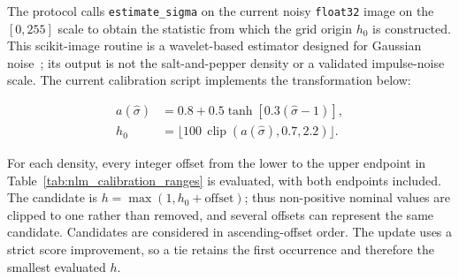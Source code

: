 \documentclass[pdflatex,iicol,sn-mathphys-num]{sn-jnl}
\newif\ifshowportuguese
\newcommand{\pt}[1]{\ifshowportuguese\par\begingroup\small\color{blue!55!black}\noindent\textbf{PT: }#1\par\endgroup\fi}
\begin{document}
The protocol calls \texttt{estimate\_sigma} on the current noisy \texttt{float32} image on the $[0,255]$ scale to obtain the statistic from which the grid origin $h_0$ is constructed. This scikit-image routine is a wavelet-based estimator designed for Gaussian noise~\cite{vanderwalt2014scikit,donoho1994ideal}; its output is not the salt-and-pepper density or a validated impulse-noise scale. The current calibration script implements the transformation below:
\pt{O protocolo chama \texttt{estimate\_sigma} na imagem ruidosa atual \texttt{float32}, na escala $[0,255]$, para obter a estatística a partir da qual se constrói a origem da grade $h_0$. Essa rotina do scikit-image é um estimador baseado em wavelets destinado a ruído Gaussiano~\cite{vanderwalt2014scikit,donoho1994ideal}; sua saída não é a densidade sal-e-pimenta nem uma escala validada para ruído impulsivo. O script atual de calibração implementa a transformação abaixo:}
\begin{equation}
\begin{aligned}
a(\hat{\sigma})&=0.8+0.5\tanh[0.3(\hat{\sigma}-1)],\\
h_0&=\lfloor100\,\operatorname{clip}(a(\hat{\sigma}),0.7,2.2)\rfloor.
\end{aligned}
\label{eq:nlm_grid_origin}
\end{equation}

For each density, every integer offset from the lower to the upper endpoint in Table~\ref{tab:nlm_calibration_ranges} is evaluated, with both endpoints included. The candidate is $h=\max(1,h_0+\mathrm{offset})$; thus non-positive nominal values are clipped to one rather than removed, and several offsets can represent the same candidate. Candidates are considered in ascending-offset order. The update uses a strict score improvement, so a tie retains the first occurrence and therefore the smallest evaluated $h$.
\pt{Para cada densidade, todo deslocamento inteiro entre os extremos inferior e superior da Tabela~\ref{tab:nlm_calibration_ranges} é avaliado, com ambas as pontas incluídas. O candidato é $h=\max(1,h_0+\mathrm{offset})$; assim, valores nominais não positivos são limitados a um, em vez de removidos, e diversos deslocamentos podem representar o mesmo candidato. Os candidatos são considerados em ordem crescente de deslocamento. A atualização usa melhoria estrita do score; portanto, um empate mantém a primeira ocorrência e, consequentemente, o menor $h$ avaliado.}
\end{document}
